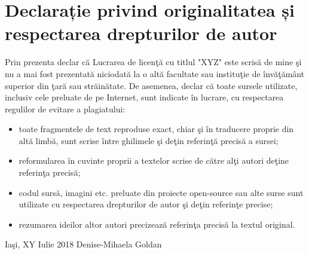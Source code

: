 \chapter*{\large {Declarație privind originalitatea și respectarea drepturilor de autor}}

Prin prezenta declar că Lucrarea de licenţă cu titlul "XYZ" este scrisă de mine şi nu a mai fost prezentată niciodată la o altă facultate sau instituţie de învăţământ superior din ţară sau străinătate. De asemenea, declar că toate sursele utilizate, inclusiv cele preluate de pe Internet, sunt indicate în lucrare, cu respectarea regulilor de evitare a plagiatului: 

\begin{itemize}
	\item toate fragmentele de text reproduse exact, chiar şi în traducere proprie din altă limbă, sunt scrise între ghilimele şi deţin referinţă precisă a sursei;
	\item reformularea în cuvinte proprii a textelor scrise de către alţi autori deţine referinţa precisă;
	\item codul sursă, imagini etc. preluate din proiecte open-source sau alte surse sunt utilizate cu respectarea drepturilor de autor şi deţin referinţe precise;  
	\item rezumarea ideilor altor autori precizează referinţa precisă la textul original.
\end{itemize}

\hfill \break
\hfill \break

Iaşi, XY Iulie 2018 \hfill Denise-Mihaela Goldan\\


\clearpage

